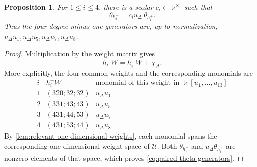 \documentclass[11pt,reqno]{amsart}
\numberwithin{equation}{section}
\newtheorem{proposition}[proposition]{Proposition}
\newtheorem{corollary}[corollary]{Corollary}
\theoremstyle{remark}
\newcommand{\kk}{\Bbbk}
\newcommand{\UR}{\mathscr U}
\newcommand{\Mu}{\mathcal M_u}
\newcommand{\udisc}{u_{\Delta}}
\begin{document}
\begin{proposition}\label{prop:paired-theta-generators}
For $1\le i\le4$, there is a scalar $c_i\in\kk^\times$ such that
\begin{equation}
\label{eq:paired-theta-generators}
 \theta_{h_i^-}=c_i\udisc\,\theta_{h_i^+}.
\end{equation}
Thus the four degree-minus-one generators are, up to normalization,
$\udisc u_1,\udisc u_5,\udisc u_7,\udisc u_8$.
\end{proposition}

\begin{proof}
Multiplication by the weight matrix gives
\[ h_i^-W=h_i^+W+\chi_\Delta. \]
More explicitly, the four common weights and the corresponding monomials are
\[
\begin{array}{c|c|c}
 i&h_i^-W&\text{monomial of this weight in }\kk[u_1,\ldots,u_{13}]\\ \hline
 1&(320;32;32)&\udisc u_1\\
 2&(331;43;43)&\udisc u_5\\
 3&(431;44;53)&\udisc u_7\\
 4&(431;53;44)&\udisc u_8.
\end{array}
\]
By \cref{lem:relevant-one-dimensional-weights}, each monomial
spans the corresponding one-dimensional weight space of $\UR$.  Both
$\theta_{h_i^-}$ and
$\udisc\theta_{h_i^+}$ are nonzero elements of that space, which proves
\eqref{eq:paired-theta-generators}.
\end{proof}


\end{document}
